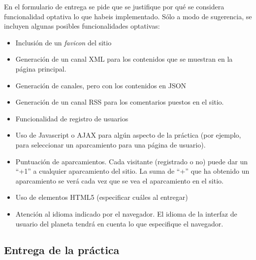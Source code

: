 En el formulario de entrega se pide que se justifique por qué se considera funcionalidad optativa lo que habeis implementado. Sólo a modo de sugerencia, se incluyen algunas posibles funcionalidades optativas:

\begin{itemize}
  \item Inclusión de un \emph{favicon} del sitio
  
  \item Generación de un canal XML para los contenidos que se muestran en la página principal.

  \item Generación de canales, pero con los contenidos en JSON

  \item Generación de un canal RSS para los comentarios puestos en el sitio.
  
  \item Funcionalidad de registro de usuarios
  
  \item Uso de Javascript o AJAX para algún aspecto de la práctica (por ejemplo, para seleccionar un aparcamiento para una página de usuario).

  \item Puntuación de aparcamientos. Cada visitante (registrado o no) puede dar un ``+1'' a cualquier aparcamiento del sitio. La suma de ``+'' que ha obtenido un aparcamiento se verá cada vez que se vea el aparcamiento en el sitio.
  
  \item Uso de elementos HTML5 (especificar cuáles al entregar)

  \item Atención al idioma indicado por el navegador. El idioma de la interfaz de usuario del planeta tendrá en cuenta lo que especifique el navegador.

\end{itemize}


\subsection{Entrega de la práctica}

